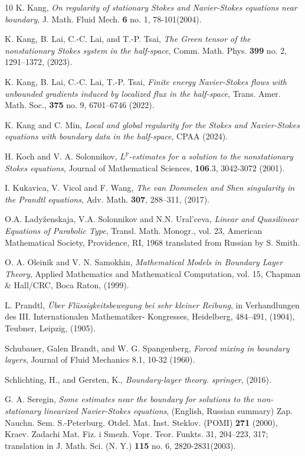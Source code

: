 \documentclass{amsart}
\numberwithin{equation}{section}
\begin{document}
\begin{thebibliography}{10}
 K. Kang, {\it On regularity of stationary Stokes and Navier-Stokes
equations near boundary}, J. Math. Fluid Mech.  {\bf 6} no. 1,
78-101(2004).

K. Kang, B. Lai, C.-C. Lai, and T.-P. Tsai, {\it The Green tensor of the nonstationary
Stokes system in the half-space},
Comm. Math. Phys. {\bf 399} no. 2, 1291–1372,  (2023).

 K. Kang, B. Lai, C.-C. Lai, T.-P. Tsai, {\it Finite energy Navier-Stokes flows with unbounded gradients induced by localized flux in the half-space}, Trans. Amer. Math. Soc., {\bf 375}  no. 9, 6701–6746 (2022).

 K. Kang and C. Min, {\it Local and global regularity for the Stokes and Navier-Stokes equations with boundary data in the half-space}, CPAA  (2024).

 H. Koch and V. A. Solonnikov, {\it $L^p$-estimates for a solution to the nonstationary Stokes equations}, Journal of Mathematical Sciences, {\bf 106}.3,  3042-3072 (2001).
 
 I. Kukavica, V. Vicol and  F. Wang, {\it The van Dommelen and Shen singularity in the Prandtl equations}, Adv. Math. {\bf 307}, 288–311, (2017).
 

  O.A. Ladyženskaja,  V.A. Solonnikov and  N.N. Ural’ceva, {\it Linear and Quasilinear Equations of Parabolic Type}, Transl. Math. 
Monogr., vol. 23, American Mathematical Society, Providence, RI, 1968 translated from Russian by S. Smith.

  O. A. Oleinik and  V. N. Samokhin, {\it Mathematical Models in Boundary Layer Theory}, Applied Mathematics and Mathematical Computation, vol. 15, Chapman \& Hall/CRC, Boca Raton, (1999).

 L. Prandtl, {\it \"{U}ber Fl\"{u}ssigkeitsbewegung bei sehr kleiner Reibung}, in Verhandlungen des III. Internationalen Mathematiker- Kongresses, Heidelberg, 484–491, (1904), Teubner, Leipzig, (1905).


 Schubauer, Galen Brandt, and W. G. Spangenberg, {\it Forced mixing in boundary layers},  Journal of Fluid Mechanics 8.1,  10-32  (1960).

 Schlichting, H., and Gersten, K., {\it  Boundary-layer theory. springer},  (2016).




 G. A. Seregin, {\it Some estimates near the boundary for solutions to the non-stationary
linearized Navier-Stokes equations}, (English, Russian summary) Zap.
Nauchn. Sem. S.-Peterburg. Otdel. Mat. Inst. Steklov. (POMI)  {\bf
271} (2000),  Kraev. Zadachi Mat. Fiz. i Smezh. Vopr. Teor. Funkts.
31, 204--223, 317;  translation in J. Math. Sci. (N. Y.)  {\bf 115}
no. 6,  2820-2831(2003).


\end{thebibliography}
\end{document}
